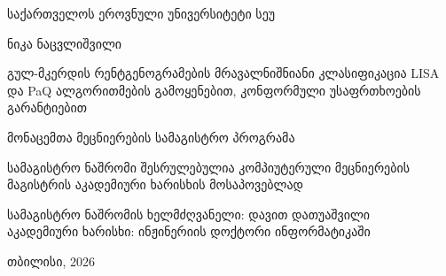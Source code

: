 \documentclass[12pt,a4paper,oneside]{report}
\newcommand{\UniversityName}{საქართველოს ეროვნული უნივერსიტეტი სეუ}
\newcommand{\ProgramName}{მონაცემთა მეცნიერების სამაგისტრო პროგრამა}
\newcommand{\ThesisTitle}{გულ-მკერდის რენტგენოგრამების მრავალნიშნიანი კლასიფიკაცია LISA და PaQ ალგორითმების გამოყენებით, კონფორმული უსაფრთხოების გარანტიებით}
\newcommand{\AuthorName}{ნიკა ნაცვლიშვილი}
\newcommand{\SupervisorName}{დავით დათუაშვილი}
\newcommand{\SupervisorDegree}{ინჟინერიის დოქტორი ინფორმატიკაში}
\newcommand{\DegreeStatement}{სამაგისტრო ნაშრომი შესრულებულია კომპიუტერული მეცნიერების მაგისტრის აკადემიური ხარისხის მოსაპოვებლად}
\newcommand{\SubmissionYear}{2026}
\newcommand{\SubmissionCity}{თბილისი}
\begin{document}

\begin{titlepage}
    \centering
    {\fontsize{18}{22}\selectfont \UniversityName\par}
    \vspace{3\baselineskip}

    {\fontsize{16}{20}\selectfont \AuthorName\par}
    \vspace{3\baselineskip}

    {\fontsize{16}{20}\selectfont \ThesisTitle\par}
    \vspace{3\baselineskip}

    {\fontsize{14}{18}\selectfont \ProgramName\par}
    \vspace{1\baselineskip}
    {\fontsize{14}{18}\selectfont \DegreeStatement\par}

    \vfill
    \begin{flushright}
        {\fontsize{14}{18}\selectfont სამაგისტრო ნაშრომის ხელმძღვანელი: \SupervisorName\\
        აკადემიური ხარისხი: \SupervisorDegree}
    \end{flushright}

    \vfill
    {\fontsize{14}{18}\selectfont \SubmissionCity, \SubmissionYear\par}
\end{titlepage}

\end{document}
